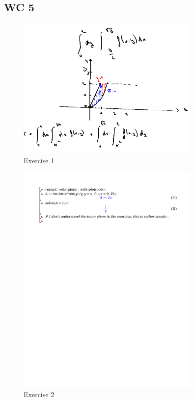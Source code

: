 \documentclass[a4paper]{report}
\begin{document}
\subsection*{WC 5}

\begin{figure}[H]
	\centering
	\includegraphics[width=0.8\textwidth]{assets/wc_5_ex_1.png}
	\caption{Exercise 1}
	\label{fig:wc_5_ex_1}
\end{figure}

\begin{figure}[H]
	\centering
	\includegraphics[width=0.8\textwidth]{exercises/wc_5_ex_2.pdf}
	\caption{Exercise 2}
	\label{fig:wc_5_ex_2}
\end{figure}
\end{document}
